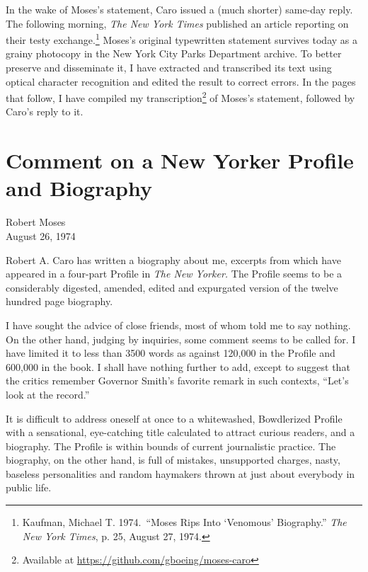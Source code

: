 \documentclass[11pt,letterpaper]{article}
\begin{document}
In the wake of Moses's statement, Caro issued a (much shorter) same-day reply. The following morning, \textit{The New York Times} published an article reporting on their testy exchange.\footnote{Kaufman, Michael T. 1974.\ \enquote{Moses Rips Into \enquote{Venomous} Biography.} \textit{The New York Times}, p. 25, August 27, 1974.} Moses's original typewritten statement survives today as a grainy photocopy in the New York City Parks Department archive. To better preserve and disseminate it, I have extracted and transcribed its text using optical character recognition and edited the result to correct errors. In the pages that follow, I have compiled my transcription\footnote{Available at \href{https://github.com/gboeing/moses-caro}{https://github.com/gboeing/moses-caro}} of Moses's statement, followed by Caro's reply to it.

\newpage

\section*{Comment on a New Yorker Profile and Biography}

\noindent Robert Moses\\
\noindent August 26, 1974\\
\vspace{1cm}

\noindent Robert A. Caro has written a biography about me, excerpts from which have appeared in a four-part Profile in \textit{The New Yorker.} The Profile seems to be a considerably digested, amended, edited and expurgated version of the twelve hundred page biography.

I have sought the advice of close friends, most of whom told me to say nothing. On the other hand, judging by inquiries, some comment seems to be called for. I have limited it to less than 3500 words as against 120,000 in the Profile and 600,000 in the book. I shall have nothing further to add, except to suggest that the critics remember Governor Smith's favorite remark in such contexts, \enquote{Let's look at the record.}

It is difficult to address oneself at once to a whitewashed, Bowdlerized Profile with a sensational, eye-catching title calculated to attract curious readers, and a biography. The Profile is within bounds of current journalistic practice. The biography, on the other hand, is full of mistakes, unsupported charges, nasty, baseless personalities and random haymakers thrown at just about everybody in public life.
\end{document}
